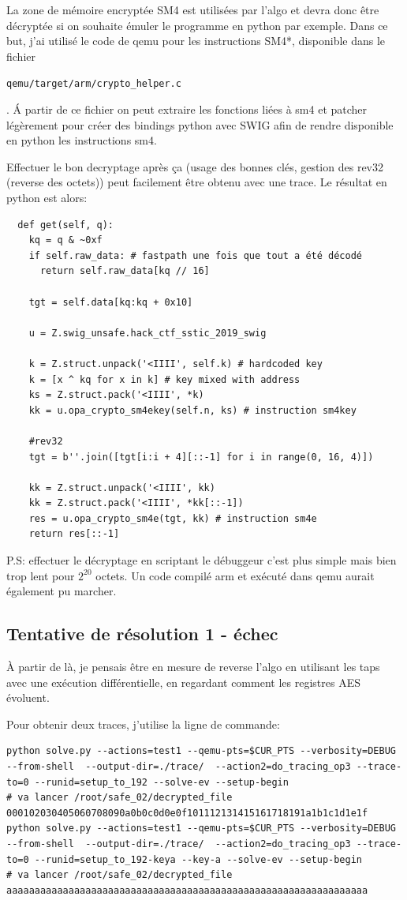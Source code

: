 \documentclass[14pt]{article}
\newcommand{\inlinebox}[2]{%
\colorbox{bg}{%
\parbox[b][0.6em]{\widthof{\texttt{#2}}}{\texttt{#2}}
}
}
\newcommand{\inlinebash}[1]{ \inlinebox{bash}{#1} }
\theoremstyle{definition}
\begin{document}
La zone de mémoire encryptée SM4 est utilisées par l'algo et devra donc être décryptée si on souhaite émuler le programme en python par exemple.
Dans ce but, j'ai utilisé le code de qemu pour les instructions SM4*, disponible dans le fichier \inlinebash{qemu/target/arm/crypto_helper.c}.
Á partir de ce fichier on peut extraire les fonctions liées à sm4 et patcher légèrement pour créer des bindings python avec SWIG afin de rendre disponible en python les instructions sm4.

Effectuer le bon decryptage après ça (usage des bonnes clés, gestion des rev32 (reverse des octets)) peut facilement être obtenu avec une trace.
Le résultat en python est alors:
\begin{verbatim}
  def get(self, q):
    kq = q & ~0xf
    if self.raw_data: # fastpath une fois que tout a été décodé
      return self.raw_data[kq // 16]

    tgt = self.data[kq:kq + 0x10]

    u = Z.swig_unsafe.hack_ctf_sstic_2019_swig

    k = Z.struct.unpack('<IIII', self.k) # hardcoded key
    k = [x ^ kq for x in k] # key mixed with address
    ks = Z.struct.pack('<IIII', *k)
    kk = u.opa_crypto_sm4ekey(self.n, ks) # instruction sm4key

    #rev32
    tgt = b''.join([tgt[i:i + 4][::-1] for i in range(0, 16, 4)])

    kk = Z.struct.unpack('<IIII', kk)
    kk = Z.struct.pack('<IIII', *kk[::-1])
    res = u.opa_crypto_sm4e(tgt, kk) # instruction sm4e
    return res[::-1]
\end{verbatim}


P.S: effectuer le décryptage en scriptant le débuggeur c'est plus simple mais bien trop lent pour $2^{20}$ octets. Un code compilé arm et exécuté dans qemu aurait également pu marcher.


\subsection{\:Tentative de résolution 1 - échec}
À partir de là, je pensais être en mesure de reverse l'algo en utilisant les taps avec une exécution différentielle, en regardant comment les registres AES évoluent.

Pour obtenir deux traces, j'utilise la ligne de commande:
\begin{verbatim}
python solve.py --actions=test1 --qemu-pts=$CUR_PTS --verbosity=DEBUG   --from-shell  --output-dir=./trace/  --action2=do_tracing_op3 --trace-to=0 --runid=setup_to_192 --solve-ev --setup-begin
# va lancer /root/safe_02/decrypted_file 000102030405060708090a0b0c0d0e0f101112131415161718191a1b1c1d1e1f
python solve.py --actions=test1 --qemu-pts=$CUR_PTS --verbosity=DEBUG   --from-shell  --output-dir=./trace/  --action2=do_tracing_op3 --trace-to=0 --runid=setup_to_192-keya --key-a --solve-ev --setup-begin
# va lancer /root/safe_02/decrypted_file aaaaaaaaaaaaaaaaaaaaaaaaaaaaaaaaaaaaaaaaaaaaaaaaaaaaaaaaaaaaaaaa
\end{verbatim}
\end{document}
